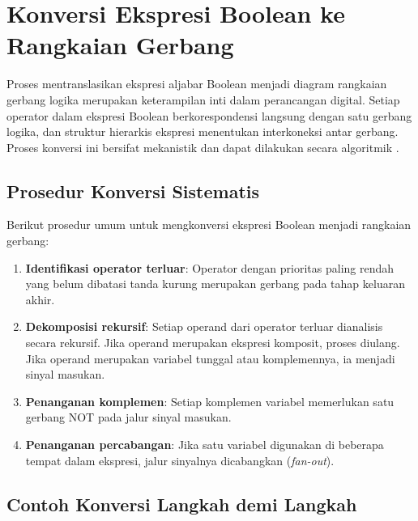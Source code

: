 \section{Konversi Ekspresi Boolean ke Rangkaian Gerbang}

Proses mentranslasikan ekspresi aljabar Boolean menjadi diagram rangkaian gerbang logika merupakan keterampilan inti dalam perancangan digital. Setiap operator dalam ekspresi Boolean berkorespondensi langsung dengan satu gerbang logika, dan struktur hierarkis ekspresi menentukan interkoneksi antar gerbang. Proses konversi ini bersifat mekanistik dan dapat dilakukan secara algoritmik \cite{rosen2019}.

\subsection{Prosedur Konversi Sistematis}

Berikut prosedur umum untuk mengkonversi ekspresi Boolean menjadi rangkaian gerbang:

\begin{enumerate}
  \item \textbf{Identifikasi operator terluar}: Operator dengan prioritas paling rendah yang belum dibatasi tanda kurung merupakan gerbang pada tahap keluaran akhir.
  \item \textbf{Dekomposisi rekursif}: Setiap operand dari operator terluar dianalisis secara rekursif. Jika operand merupakan ekspresi komposit, proses diulang. Jika operand merupakan variabel tunggal atau komplemennya, ia menjadi sinyal masukan.
  \item \textbf{Penanganan komplemen}: Setiap komplemen variabel memerlukan satu gerbang NOT pada jalur sinyal masukan.
  \item \textbf{Penanganan percabangan}: Jika satu variabel digunakan di beberapa tempat dalam ekspresi, jalur sinyalnya dicabangkan (\textit{fan-out}).
\end{enumerate}

\subsection{Contoh Konversi Langkah demi Langkah}

